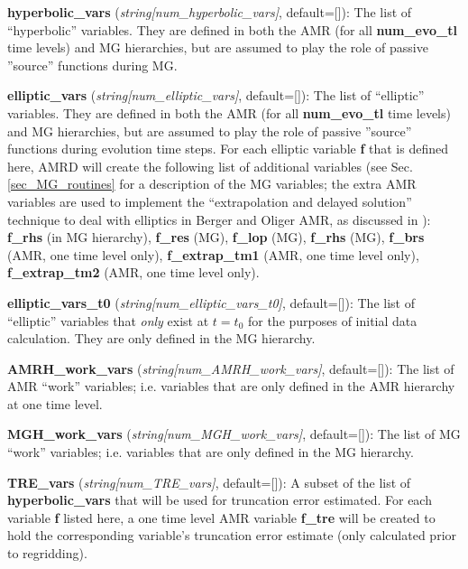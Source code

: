 \documentclass[aps,amssymb,unsortedaddress,nofootinbib]{revtex4}
\def\lsep{\itemsep 0.05in}
\begin{document}
\begin{list}{}{\lsep}
\item {\bf hyperbolic\_vars} ({\em string[num\_hyperbolic\_vars]}, default=[]):
      The list of ``hyperbolic'' variables. They are defined in both the
      AMR (for all {\bf num\_evo\_tl} time levels) and MG hierarchies, but
      are assumed to play the role of passive ''source'' functions during MG.
\item {\bf elliptic\_vars} ({\em string[num\_elliptic\_vars]}, default=[]):
      The list of ``elliptic'' variables. They are defined in both the
      AMR (for all {\bf num\_evo\_tl} time levels) and MG hierarchies,
      but are assumed to play the role of passive ''source'' functions during
      evolution time steps. For each elliptic variable {\bf f} that is
      defined here, AMRD will create the following list of additional 
      variables (see Sec. \ref{sec_MG_routines} for a description of
      the MG variables; the extra AMR variables are used to implement the
      ``extrapolation and delayed solution'' technique to deal with elliptics
      in Berger and Oliger AMR, as discussed in \cite{fpthesis}): 
      {\bf f\_rhs} (in MG hierarchy), {\bf f\_res} (MG), 
      {\bf f\_lop} (MG), {\bf f\_rhs} (MG), {\bf f\_brs} (AMR, one time level only),
      {\bf f\_extrap\_tm1} (AMR, one time level only),
      {\bf f\_extrap\_tm2} (AMR, one time level only).
\item {\bf elliptic\_vars\_t0} ({\em string[num\_elliptic\_vars\_t0]}, default=[]):
      The list of ``elliptic'' variables that {\em only} exist at $t=t_0$ for
      the purposes of initial data calculation. They are only defined in
      the MG hierarchy.
\item {\bf AMRH\_work\_vars} ({\em string[num\_AMRH\_work\_vars]}, default=[]):
      The list of AMR ``work'' variables; i.e. variables that are only defined
      in the AMR hierarchy at one time level.
\item {\bf MGH\_work\_vars} ({\em string[num\_MGH\_work\_vars]}, default=[]):
      The list of MG ``work'' variables; i.e. variables that are only defined
      in the MG hierarchy.
\item {\bf TRE\_vars} ({\em string[num\_TRE\_vars]}, default=[]):
      A subset of the list of {\bf hyperbolic\_vars} that will be used for
      truncation error estimated. For each variable {\bf f} listed here,
      a one time level AMR variable {\bf f\_tre} will be created to hold the
      corresponding variable's truncation error estimate (only calculated prior
      to regridding).
\end{list}
\end{document}
